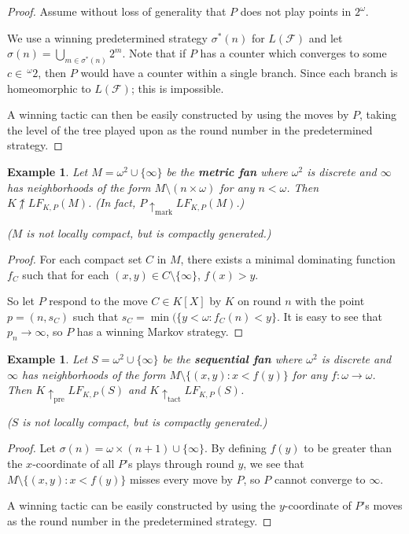 \documentclass[11pt]{article}
\theoremstyle{plain}
\newtheorem{example}[theorem]{Example}
\theoremstyle{definition}
\theoremstyle{remark}
\newcommand{\win}{\uparrow}
\newcommand{\prewin}{\uparrow_{\text{pre}}}
\newcommand{\markwin}{\uparrow_{\text{mark}}}
\newcommand{\tactwin}{\uparrow_{\text{tact}}}
\newcommand{\lfkpgame}[1]{LF_{K,P}(#1)}
\newcommand{\<}{\langle}
\renewcommand{\>}{\rangle}
\begin{document}
\begin{proof}
Assume without loss of generality that $P$ does not play points in $2^\omega$.

We use a winning predetermined strategy $\sigma^*(n)$ for $L(\mathcal{F})$ and let $\sigma(n) = \bigcup_{m \in \sigma^*(n)} 2^m$. Note that if $P$ has a counter which converges to some $c\in \,^\omega2$, then $P$ would have a counter within a single branch. Since each branch is homeomorphic to $L(\mathcal{F})$; this is impossible.

A winning tactic can then be easily constructed by using the moves by $P$, taking the level of the tree played upon as the round number in the predetermined strategy.
\end{proof}

\begin{example}
Let $M = \omega^2 \cup \{\infty\}$ be the \textbf{metric fan} where $\omega^2$ is discrete and $\infty$ has neighborhoods of the form $M \setminus (n\times\omega)$ for any $n<\omega$. Then $K \not\win \lfkpgame{M}$. (In fact, $P \markwin \lfkpgame{M}$.)

($M$ is not locally compact, but is compactly generated.)
\end{example}

\begin{proof}
For each compact set $C$ in $M$, there exists a minimal dominating function $f_C$ such that for each $(x,y)\in C\setminus\{\infty\}$, $f(x)> y$.

So let $P$ respond to the move $C\in K[X]$ by $K$ on round $n$ with the point $p=(n,s_C)$ such that $s_C = \min(\{y<\omega : f_C(n) < y\}$. It is easy to see that $p_n\rightarrow \infty$, so $P$ has a winning Markov strategy.
\end{proof}

\begin{example}
Let $S = \omega^2 \cup \{\infty\}$ be the \textbf{sequential fan} where $\omega^2$ is discrete and $\infty$ has neighborhoods of the form $M \setminus \{(x,y) : x<f(y)\}$ for any $f:\omega\to\omega$. Then $K \prewin \lfkpgame{S}$ and $K\tactwin \lfkpgame{S}$.

($S$ is not locally compact, but is compactly generated.)


\end{example}

\begin{proof}
Let $\sigma(n)=\omega\times(n+1) \cup \{\infty\}$. By defining $f(y)$ to be greater than the $x$-coordinate of all $P$'s plays through round $y$, we see that $M\setminus\{(x,y): x<f(y)\}$ misses every move by $P$, so $P$ cannot converge to $\infty$.

A winning tactic can be easily constructed by using the $y$-coordinate of $P$'s moves as the round number in the predetermined strategy.
\end{proof}
\end{document}
